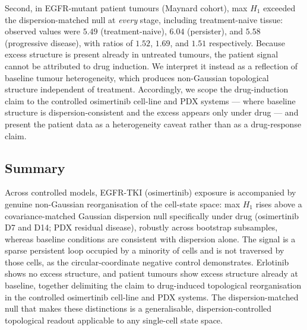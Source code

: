Second, in EGFR-mutant patient tumours (Maynard cohort), max $H_1$
exceeded the dispersion-matched null at \emph{every} stage, including
treatment-naive tissue: observed values were $5.49$ (treatment-naive),
$6.04$ (persister), and $5.58$ (progressive disease), with ratios of
$1.52$, $1.69$, and $1.51$ respectively. Because excess structure is
present already in untreated tumours, the patient signal cannot be
attributed to drug induction. We interpret it instead as a reflection of
baseline tumour heterogeneity, which produces non-Gaussian topological
structure independent of treatment. Accordingly, we scope the
drug-induction claim to the controlled osimertinib cell-line and PDX
systems --- where baseline structure is dispersion-consistent and the
excess appears only under drug --- and present the patient data as a
heterogeneity caveat rather than as a drug-response claim.

\subsection*{Summary}

Across controlled models, EGFR-TKI (osimertinib) exposure is accompanied
by genuine non-Gaussian reorganisation of the cell-state space: max $H_1$
rises above a covariance-matched Gaussian dispersion null specifically
under drug (osimertinib D7 and D14; PDX residual disease), robustly
across bootstrap subsamples, whereas baseline conditions are consistent
with dispersion alone. The signal is a sparse persistent loop occupied by
a minority of cells and is not traversed by those cells, as the
circular-coordinate negative control demonstrates. Erlotinib shows no
excess structure, and patient tumours show excess structure already at
baseline, together delimiting the claim to drug-induced topological
reorganisation in the controlled osimertinib cell-line and PDX systems.
The dispersion-matched null that makes these distinctions is a
generalisable, dispersion-controlled topological readout applicable to
any single-cell state space.
